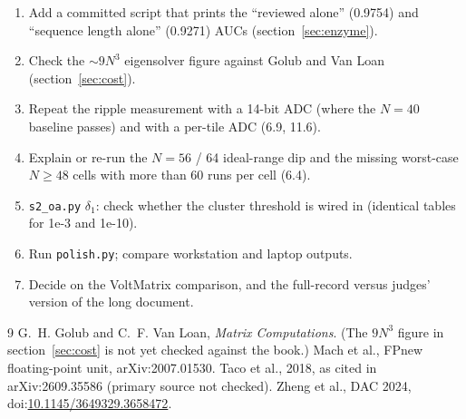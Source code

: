 \documentclass[11pt]{article}
\newcommand{\scr}[1]{\texttt{#1}}
\begin{document}
\begin{enumerate}
  \item Add a committed script that prints the ``reviewed alone'' (0.9754) and ``sequence length alone'' (0.9271) AUCs (section~\ref{sec:enzyme}).
  \item Check the $\sim 9N^3$ eigensolver figure against Golub and Van Loan (section~\ref{sec:cost}).
  \item Repeat the ripple measurement with a 14-bit ADC (where the $N = 40$ baseline passes) and with a per-tile ADC (6.9, 11.6).
  \item Explain or re-run the $N = 56$ / 64 ideal-range dip and the missing worst-case $N \geq 48$ cells with more than 60 runs per cell (6.4).
  \item \scr{s2\_oa.py} $\delta_1$: check whether the cluster threshold is wired in (identical tables for 1e-3 and 1e-10).
  \item Run \scr{polish.py}; compare workstation and laptop outputs.
  \item Decide on the VoltMatrix comparison, and the full-record versus judges' version of the long document.
\end{enumerate}

\begin{thebibliography}{9}
 G.~H. Golub and C.~F. Van Loan, \emph{Matrix Computations}. (The $9N^3$ figure in section~\ref{sec:cost} is not yet checked against the book.)
 Mach et al., FPnew floating-point unit, arXiv:2007.01530.
 Taco et al., 2018, as cited in arXiv:2609.35586 (primary source not checked).
 Zheng et al., DAC 2024, doi:\href{https://doi.org/10.1145/3649329.3658472}{10.1145/3649329.3658472}.
\end{thebibliography}
\end{document}
